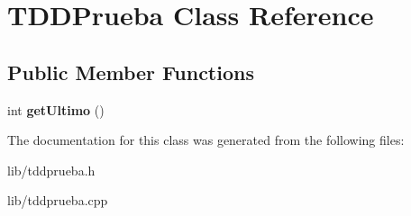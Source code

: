 \hypertarget{class_t_d_d_prueba}{\section{T\+D\+D\+Prueba Class Reference}
\label{class_t_d_d_prueba}
}
\subsection*{Public Member Functions}
\begin{DoxyCompactItemize}
\item 
\hypertarget{class_t_d_d_prueba_aaa2c3c0342544285627f6b70468f8407}{int {\bfseries get\+Ultimo} ()}\label{class_t_d_d_prueba_aaa2c3c0342544285627f6b70468f8407}

\end{DoxyCompactItemize}


The documentation for this class was generated from the following files\+:\begin{DoxyCompactItemize}
\item 
lib/tddprueba.\+h\item 
lib/tddprueba.\+cpp\end{DoxyCompactItemize}
